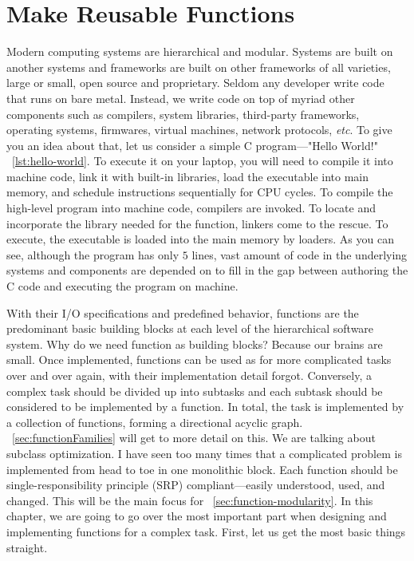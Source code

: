 \chapter{Make Reusable Functions}\label{ch:reusableFunctions}

Modern computing systems are hierarchical and modular.
Systems are built on another systems and frameworks are built on other frameworks
of all varieties, large or small, open source and proprietary.
Seldom any developer write code that runs on bare metal.
Instead, we write code on top of myriad other components such as compilers, system
libraries, third-party frameworks, operating systems, firmwares, virtual machines, network
protocols, \textit{etc}.
To give you an idea about that, let us consider a simple C program---"Hello World!"
~\autoref{lst:hello-world}.
To execute it on your laptop, you will need to compile it into machine code,
link it with built-in libraries, load the executable into main memory,
and schedule instructions sequentially for CPU cycles.
To compile the high-level program into machine code, compilers are invoked.
To locate and incorporate the  library needed for the  function, linkers
come to the rescue.
To execute, the executable is loaded into the main memory by loaders.
As you can see, although the program has only $5$ lines, vast amount of code in the
underlying systems and components are depended on to fill in the gap between authoring the C code
and executing the program on machine.


With their I/O specifications and predefined behavior, functions are the predominant
basic building blocks at each level of the hierarchical software system.
Why do we need function as building blocks?
Because our brains are small.
Once implemented, functions can be used as for more complicated tasks over and over again, with
their implementation detail forgot.
Conversely, a complex task should be divided up into subtasks and each subtask should be
considered to be implemented by a function.
In total, the task is implemented by a collection of functions, forming a directional acyclic
graph.
~\autoref{sec:functionFamilies} will get to more detail on this.
We are talking about subclass optimization.
I have seen too many times that a complicated problem is implemented from head to toe in one
monolithic block.
Each function should be single-responsibility principle (SRP) compliant---easily understood, used,
and changed.
This will be the main focus for ~\autoref{sec:function-modularity}.
In this chapter, we are going to go over the most important part when designing and implementing
functions for a complex task.
First, let us get the most basic things straight.


